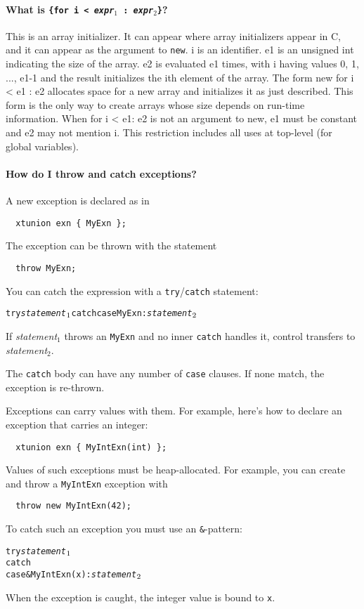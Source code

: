 \paragraph{What is \texttt{\{for i < {\it expr}$_1$ : {\it expr}$_2$\}}?}

This is an array initializer.  It can appear where array
initializers appear in C, and it can appear as the argument to
\texttt{new}.
i
is an identifier.  e1 is an unsigned int indicating the size of the
array.  e2 is evaluated e1 times, with i having values 0, 1, ..., e1-1
and the result initializes the ith element of the array.  The form new
{for i < e1 : e2} allocates space for a new array and initializes it
as just described.  This form is the only way to create arrays whose
size depends on run-time information.  When {for i < e1: e2} is not an
argument to new, e1 must be constant and e2 may not mention i.  This
restriction includes all uses at top-level (for global variables).

\paragraph{How do I throw and catch exceptions?}

A new exception is declared as in 
\begin{verbatim}
  xtunion exn { MyExn };
\end{verbatim}
The exception can be thrown with the statement
\begin{verbatim}
  throw MyExn;
\end{verbatim}
You can catch the expression with a \texttt{try}/\texttt{catch}
statement:
\begin{alltt}
  try {\it statement}\(\sb{1}\) catch \lb case MyExn: {\it statement}\(\sb{2}\) \rb
\end{alltt}
If {\it statement}$_1$ throws an \texttt{MyExn} and no inner
\texttt{catch} handles it, control transfers to 
{\it statement}$_2$.

The \texttt{catch} body can have any number of \texttt{case} clauses.
If none match, the exception is re-thrown.

Exceptions can carry values with them.  For example, here's how to
declare an exception that carries an integer:
\begin{verbatim}
  xtunion exn { MyIntExn(int) };
\end{verbatim}
Values of such exceptions must be heap-allocated.  For example, you
can create and throw a \texttt{MyIntExn} exception with
\begin{verbatim}
  throw new MyIntExn(42);
\end{verbatim}
To catch such an exception you must use an \texttt{\&}-pattern:
\begin{alltt}
  try {\it statement}\(\sb{1}\)
  catch \lb
    case &MyIntExn(x): {\it statement}\(\sb{2}\)
  \rb
\end{alltt}
When the exception is caught, the integer value is bound to \texttt{x}.


